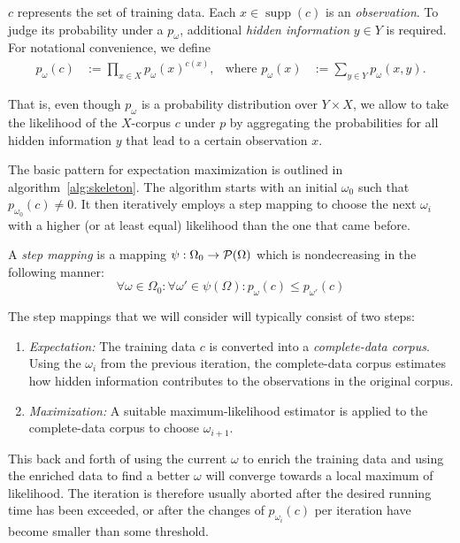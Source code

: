 $c$ represents the set of training data. Each $x\in\operatorname{supp}(c)$ is
an \emph{observation}. To judge its probability under a $p_\omega$, additional
\emph{hidden information} $y\in Y$ is required. For notational convenience, we define
\begin{align*}
 p_\omega(c) &:= \prod_{x\in X} p_\omega(x)^{c(x)}, &
 \text{where } p_\omega(x) &:= \sum_{y\in Y} p_\omega(x,y).
\end{align*}

That is, even though $p_\omega$ is a probability distribution over $Y\times X$,
we allow to take the likelihood of the $X$-corpus $c$ under $p$ by aggregating
the probabilities for all hidden information $y$ that lead to a certain
observation $x$.

The basic pattern for expectation maximization is outlined in
algorithm~\ref{alg:skeleton}. The algorithm starts with an initial $\omega_0$
such that $p_{\omega_0}(c) \neq 0$. It then iteratively employs a step mapping
to choose the next $\omega_i$ with a higher (or at least equal) likelihood than
the one that came before.

\begin{definition}
 A \emph{step mapping} is a mapping $\psi:\Omega_0\to\mathcal P(\Omega)$ which is
 nondecreasing in the following manner:
 \[
  \forall \omega\in\Omega_0: \forall \omega'\in\psi(\Omega): p_\omega(c) \leq p_{\omega'}(c)
 \]
\end{definition}

The step mappings that we will consider will typically consist of two steps:
\begin{enumerate}
 \item \emph{Expectation:} The training data $c$ is converted into a
  \emph{complete-data corpus}. Using the $\omega_i$ from the previous
  iteration, the complete-data corpus estimates how hidden information
  contributes to the observations in the original corpus.
 \item \emph{Maximization:} A suitable maximum-likelihood estimator is applied
  to the complete-data corpus to choose $\omega_{i+1}$.
\end{enumerate}

This back and forth of using the current $\omega$ to enrich the training data
and using the enriched data to find a better $\omega$ will converge towards a
local maximum of likelihood. The iteration is therefore usually aborted after
the desired running time has been exceeded, or after the changes of
$p_{\omega_i}(c)$ per iteration have become smaller than some threshold.

